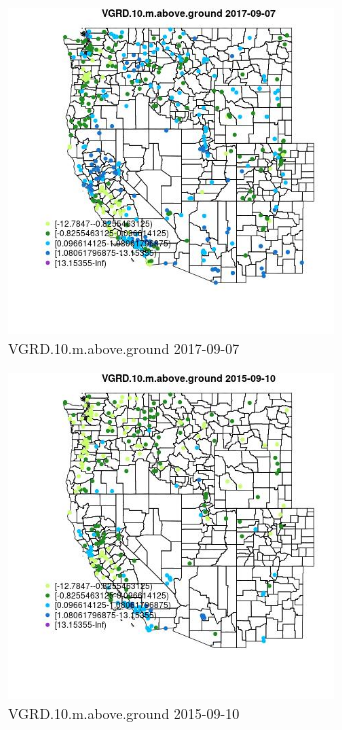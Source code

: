 \begin{figure} 
\centering  
\includegraphics[width=0.77\textwidth]{Code_Outputs/Report_ML_input_PM25_Step4_part_e_de_duplicated_aves_compiled_2019-05-21wNAs_MapObsVGRD10maboveground2017-09-07.jpg} 
\caption{\label{fig:Report_ML_input_PM25_Step4_part_e_de_duplicated_aves_compiled_2019-05-21wNAsMapObsVGRD10maboveground2017-09-07}VGRD.10.m.above.ground 2017-09-07} 
\end{figure} 
 

\begin{figure} 
\centering  
\includegraphics[width=0.77\textwidth]{Code_Outputs/Report_ML_input_PM25_Step4_part_e_de_duplicated_aves_compiled_2019-05-21wNAs_MapObsVGRD10maboveground2015-09-10.jpg} 
\caption{\label{fig:Report_ML_input_PM25_Step4_part_e_de_duplicated_aves_compiled_2019-05-21wNAsMapObsVGRD10maboveground2015-09-10}VGRD.10.m.above.ground 2015-09-10} 
\end{figure} 
 

